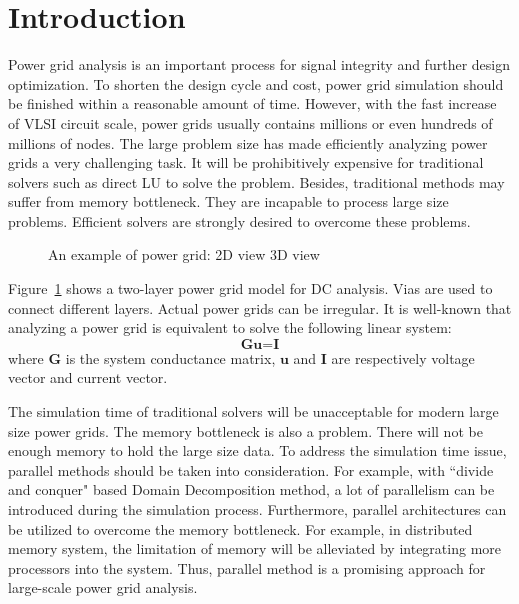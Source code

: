 \documentclass{sig-alternate}
\begin{document}
\section{Introduction}
Power grid analysis is an important process for signal integrity and further design 
optimization. To shorten the design cycle and cost, power grid simulation should be finished within a reasonable amount of time. 
However, with the fast increase of VLSI circuit scale, power grids usually contains millions or even hundreds of millions 
of nodes. The large problem size has made efficiently analyzing power grids a very challenging task. It will be prohibitively 
expensive for traditional solvers such as direct LU to solve the problem. Besides, traditional methods may suffer from memory 
bottleneck. They are incapable to process large size problems. Efficient solvers are strongly desired to overcome these problems.

	\begin{figure}[htbp]
	  \caption{An example of power grid: 
	   2D view
	   3D view}
	  \label{pg_model}
	\end{figure}
Figure~\ref{pg_model} shows a two-layer power grid model for DC analysis.  Vias are used to 
	connect different layers. Actual power grids can be irregular. It is well-known that analyzing a power grid is 
	equivalent to solve the following linear system: 
	\begin{equation}\label{eq1}
		\textbf{Gu=I}
	\end{equation}
where {$\textbf{G}$} is the system conductance matrix, $\textbf{u}$ and $\textbf{I}$ are respectively voltage vector and current vector.

	The simulation time of traditional solvers will be unacceptable for modern large size power grids.
	The memory bottleneck is also a problem. There will not be enough memory to hold the large size data. To address the
	simulation time issue, parallel methods should be taken into consideration. For example, with ``divide and
	conquer" based Domain Decomposition method, a lot of parallelism can be introduced during the simulation process. Furthermore,
	parallel architectures can be utilized to overcome the memory bottleneck. For example, in distributed memory system, the 
	limitation of memory will be alleviated by integrating more processors into the system. Thus, parallel method is a 
	promising approach for large-scale power grid analysis. 
\end{document}
